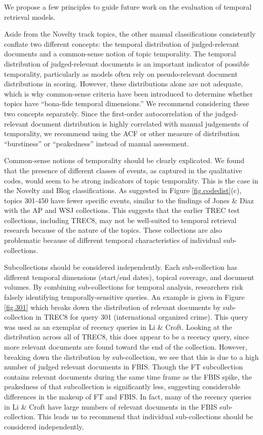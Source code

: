 \documentclass[runningheads,a4paper]{llncs}
\begin{document}
We propose a few principles to guide future work on the evaluation of temporal retrieval models.

Aside from the Novelty track topics, the other manual classifications consistently conflate two different concepts: the temporal distribution of judged-relevant documents and a common-sense notion of topic temporality. The temporal distribution of judged-relevant documents is an important indicator of possible temporality, particularly as models often rely on pseudo-relevant document distributions in scoring. However, these distributions alone are not adequate, which is why common-sense criteria have been introduced to determine whether topics have ``bona-fide temporal dimensions.'' We recommend considering these two concepts separately.  Since the first-order autocorrelation of the judged-relevant document distribution is highly correlated with manual judgements of temporality, we recommend using the ACF or other measure of distribution ``burstiness'' or ``peakedness'' instead of manual assessment.  

Common-sense notions of temporality should be clearly explicated.  We found that the presence of different classes of events, as captured in the qualitative codes, would seem to be strong indicators of topic temporality.  This is the case in the Novelty and Blog classifications. As suggested in Figure \ref{fig.codedist}(c), topics 301-450 have fewer specific events, similar to the findings of Jones \& Diaz with the AP and WSJ collections. This suggests that the earlier TREC test collections, including TREC8, may not be well-suited to temporal retrieval research because of the nature of the topics. These collections are also problematic because of different temporal characteristics of individual sub-collections.

Subcollections should be considered independently. Each sub-collection has different temporal dimensions (start/end dates), topical coverage, and document volumes. By combining sub-collections for temporal analysis, researchers risk falsely identifying temporally-sensitive queries. An example is given in Figure \ref{fig.301} which breaks down the distribution of relevant documents by sub-collection in TREC8 for query 301 (international organized crime). This query was used as an exemplar of recency queries in Li \& Croft. Looking at the distribution across all of TREC8, this does appear to be a recency query, since more relevant documents are found toward the end of the collection. However, breaking down the distribution by sub-collection, we see that this is due to a high number of judged relevant documents in FBIS. Though the FT subcollection contains relevant documents during the same time frame as the FBIS spike, the peakedness of that subcollection is significantly less, suggesting considerable differences in the makeup of FT and FBIS. In fact, many of the recency queries in Li \& Croft have large numbers of relevant documents in the FBIS sub-collection.    This leads us to recommend that individual sub-collections should be considered independently.
\end{document}
